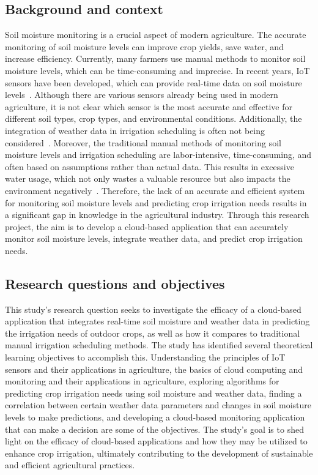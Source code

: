 \documentclass[11pt]{scrartcl} %
\begin{document}
\subsection{Background and context}
Soil moisture monitoring is a crucial aspect of modern agriculture. The accurate monitoring of soil moisture levels can improve crop yields, save water, and increase efficiency. Currently, many farmers use manual methods to monitor soil moisture levels, which can be time-consuming and imprecise. In recent years, IoT sensors have been developed, which can provide real-time data on soil moisture levels~\parencite{bwambale2022smart}.
\newline Although there are various sensors already being used in modern agriculture, it is not clear which sensor is the most accurate and effective for different soil types, crop types, and environmental conditions. Additionally, the integration of weather data in irrigation scheduling is often not being considered~\parencite{nandurkar2014design}.
\newline Moreover, the traditional manual methods of monitoring soil moisture levels and irrigation scheduling are labor-intensive, time-consuming, and often based on assumptions rather than actual data. This results in excessive water usage, which not only wastes a valuable resource but also impacts the environment negatively~\parencite{bwambale2022smart}.
\newline Therefore, the lack of an accurate and efficient system for monitoring soil moisture levels and predicting crop irrigation needs results in a significant gap in knowledge in the agricultural industry. Through this research project, the aim is to develop a cloud-based application that can accurately monitor soil moisture levels, integrate weather data, and predict crop irrigation needs.

\subsection{Research questions and objectives}
This study's research question seeks to investigate the efficacy of a cloud-based application that integrates real-time soil moisture and weather data in predicting the irrigation needs of outdoor crops, as well as how it compares to traditional manual irrigation scheduling methods. The study has identified several theoretical learning objectives to accomplish this.
\newline Understanding the principles of IoT sensors and their applications in agriculture, the basics of cloud computing and monitoring and their applications in agriculture, exploring algorithms for predicting crop irrigation needs using soil moisture and weather data, finding a correlation between certain weather data parameters and changes in soil moisture levels to make predictions, and developing a cloud-based monitoring application that can make a decision are some of the objectives. The study's goal is to shed light on the efficacy of cloud-based applications and how they may be utilized to enhance crop irrigation, ultimately contributing to the development of sustainable and efficient agricultural practices.
\end{document}
